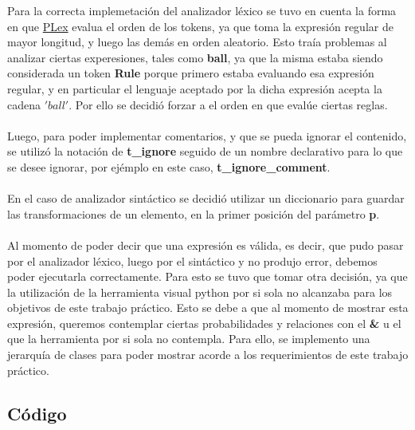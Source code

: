 Para la correcta implemetaci\'on del analizador l\'exico se tuvo en cuenta la forma en que \href{http://www.dabeaz.com/ply/ply.html#ply_nn3}{PLex} evalua el orden de los tokens, ya que toma la expresi\'on regular de mayor longitud, y luego las dem\'as en orden aleatorio. Esto tra\'ia problemas al analizar ciertas experesiones, tales como \textbf{ball}, ya que la misma estaba siendo considerada un token \textbf{Rule} porque primero estaba evaluando esa expresi\'on regular, y en particular el lenguaje aceptado por la dicha expresi\'on acepta la cadena $'ball'$. Por ello se decidi\'o forzar a el orden en que eval\'ue ciertas reglas.
\\
\\
Luego, para poder implementar comentarios, y que se pueda ignorar el contenido, se utiliz\'o la notaci\'on de \textbf{t\_ignore} seguido de un nombre declarativo para lo que se desee ignorar, por ej\'emplo en este caso, \textbf{t\_ignore\_comment}.
\\
\\
En el caso de analizador sint\'actico se decidi\'o utilizar un diccionario para guardar las transformaciones de un elemento, en la primer posici\'on del par\'ametro \textbf{p}.
\\
\\
Al momento de poder decir que una expresi\'on es v\'alida, es decir, que pudo pasar por el analizador l\'exico, luego por el sint\'actico y no produjo error, debemos poder ejecutarla correctamente. Para esto se tuvo que tomar otra decisi\'on, ya que la utilizaci\'on de la herramienta visual python por si sola no alcanzaba para los objetivos de este trabajo pr\'actico. Esto se debe a que al momento de mostrar esta expresi\'on, queremos contemplar ciertas probabilidades y relaciones con el \textbf{ \& } u el \textbf{ \textbar } que la herramienta por si sola no contempla. 
Para ello, se implemento una jerarqu\'ia de clases para poder mostrar acorde a los requerimientos de este trabajo pr\'actico.


\subsection{C\'odigo}

